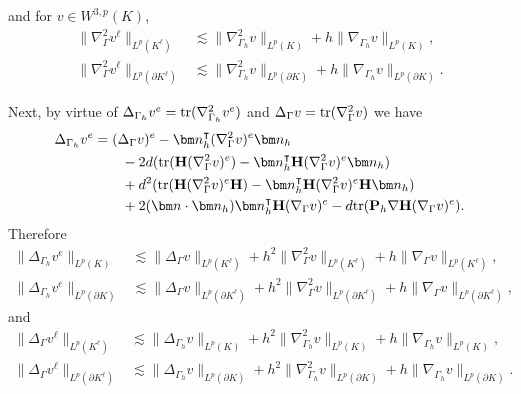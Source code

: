 \documentclass[10pt, a4paper]{amsart}
\newcommand{\bn}{{\bm n}}
\newcommand{\p}{\partial}
\newcommand{\nab}{\nabla}
\theoremstyle{definition}
\theoremstyle{remark}
\theoremstyle{example}
\numberwithin{equation}{section}
\begin{document}
%
and for $v\in W^{3,p}(K)$,
\begin{equation}
    \label{eqn:HessEquivBound2}
\begin{split}
\|\nab_{\Gamma}^2 v^\ell\|_{L^p(K^\ell)}
&\lesssim \|\nab_{\Gamma_h}^2 v\|_{L^p(K)}
+ h \|\nab_{\Gamma_h} v\|_{L^p(K)},\\
%
\|\nab_{\Gamma}^2 v^\ell\|_{L^p(\p K^\ell)}
&\lesssim \|\nab_{\Gamma_h}^2 v\|_{L^p(\p K)}
+ h \|\nab_{\Gamma_h} v\|_{L^p(\p K)}.
\end{split}
\end{equation}

Next, by virtue of $\Delta_{\Gamma_h}v^e = {\rm tr}(\nab_{\Gamma_h}^2v^e)$ 
and $\Delta_{\Gamma}v = {\rm tr}(\nab_{\Gamma}^2v)$ 
we have
\begin{equation}\label{LapChain}
\begin{split}
\Delta_{\Gamma_h}v^e
& = (\Delta_\Gamma v)^e - \bn_h^\intercal(\nab_\Gamma^2v)^e\bn_h \\
& \qquad - 2d({\rm tr}({\bf H}(\nab_\Gamma^2v)^e) - \bn_h^\intercal{\bf H}(\nab_\Gamma^2v)^e\bn_h) \\
& \qquad + d^2({\rm tr}({\bf H}(\nab_\Gamma^2v)^e{\bf H}) - \bn_h^\intercal{\bf H}(\nab_\Gamma^2v)^e{\bf H}\bn_h) \\
& \qquad + 2(\bn \cdot \bn_h)\bn_h^\intercal{\bf H}(\nab_\Gamma v)^e - d{\rm tr}({\bf P}_h\nab{\bf H}(\nab_\Gamma v)^e).
\end{split}
\end{equation}
%
Therefore
%
\begin{equation}
    \label{eqn:LapEquivBound}
\begin{split}
\|\Delta_{\Gamma_h} v^e\|_{L^p(K)}&\lesssim \|\Delta_\Gamma v\|_{L^p(K^\ell)}+h^2 \|\nab^2_\Gamma v\|_{L^p(K^\ell)}+ h \|\nab_\Gamma v\|_{L^p(K^\ell)},\\
%
\|\Delta_{\Gamma_h} v^e\|_{L^p(\p K)}&\lesssim \|\Delta_\Gamma v\|_{L^p(\p K^\ell)}+h^2 \|\nab^2_\Gamma v\|_{L^p(\p K^\ell)}+ h \|\nab_\Gamma v\|_{L^p(\p K^\ell)},
\end{split}
\end{equation}
and
\begin{equation}
    \label{eqn:LapEquivBound2}
\begin{split}
\|\Delta_{\Gamma} v^\ell\|_{L^p(K^\ell)}&\lesssim \|\Delta_{\Gamma_h} v\|_{L^p(K)}+h^2 \|\nab^2_{\Gamma_h} v\|_{L^p(K)}+ h \|\nab_{\Gamma_h} v\|_{L^p(K)},\\
%
\|\Delta_{\Gamma} v^\ell\|_{L^p(\p K^\ell)}&\lesssim \|\Delta_{\Gamma_h} v\|_{L^p(\p K)}+h^2 \|\nab^2_{\Gamma_h} v\|_{L^p(\p K)}+ h \|\nab_{\Gamma_h} v\|_{L^p(\p K)}.
\end{split}
\end{equation}
\end{document}
